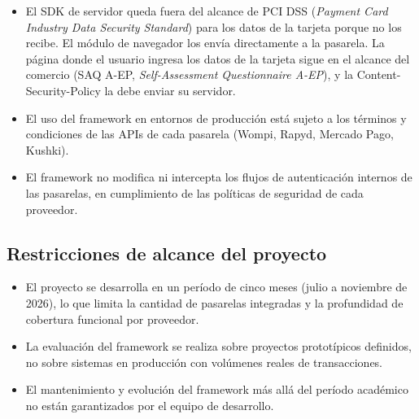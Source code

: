 \begin{itemize}
  \item El SDK de servidor queda fuera del alcance de PCI DSS (\textit{Payment Card Industry Data Security Standard}) para los datos de la tarjeta porque no los recibe. El módulo de navegador los envía directamente a la pasarela. La página donde el usuario ingresa los datos de la tarjeta sigue en el alcance del comercio (SAQ A-EP, \textit{Self-Assessment Questionnaire A-EP}), y la Content-Security-Policy la debe enviar su servidor.
  \item El uso del framework en entornos de producción está sujeto a los términos y condiciones de las APIs de cada pasarela (Wompi, Rapyd, Mercado Pago, Kushki).
  \item El framework no modifica ni intercepta los flujos de autenticación internos de las pasarelas, en cumplimiento de las políticas de seguridad de cada proveedor.
\end{itemize}

\subsection{Restricciones de alcance del proyecto}

\begin{itemize}
  \item El proyecto se desarrolla en un período de cinco meses (julio a noviembre de 2026), lo que limita la cantidad de pasarelas integradas y la profundidad de cobertura funcional por proveedor.
  \item La evaluación del framework se realiza sobre proyectos prototípicos definidos, no sobre sistemas en producción con volúmenes reales de transacciones.
  \item El mantenimiento y evolución del framework más allá del período académico no están garantizados por el equipo de desarrollo.
\end{itemize}
